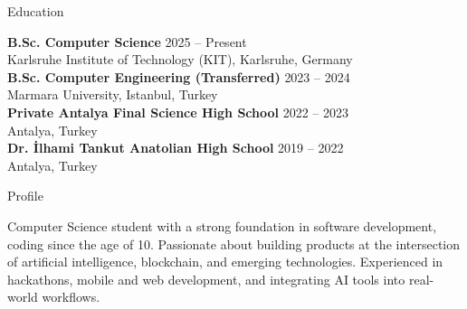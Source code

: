 \documentclass{resume} %
\begin{document}
  


\begin{rSection}{Education}

{\bf B.Sc. Computer Science} \hfill {2025 -- Present} \\
Karlsruhe Institute of Technology (KIT), Karlsruhe, Germany \\[0.1cm]
{\bf B.Sc. Computer Engineering (Transferred)} \hfill {2023 -- 2024} \\
Marmara University, Istanbul, Turkey \\[0.1cm]
{\bf Private Antalya Final Science High School} \hfill {2022 -- 2023} \\
Antalya, Turkey \\[0.1cm]
{\bf Dr. İlhami Tankut Anatolian High School} \hfill {2019 -- 2022} \\
Antalya, Turkey

\end{rSection} 


\begin{rSection}{Profile}

Computer Science student with a strong foundation in software development, coding since the age of 10. Passionate about building products at the intersection of artificial intelligence, blockchain, and emerging technologies. Experienced in hackathons, mobile and web development, and integrating AI tools into real-world workflows.

\end{rSection}

\end{document}
